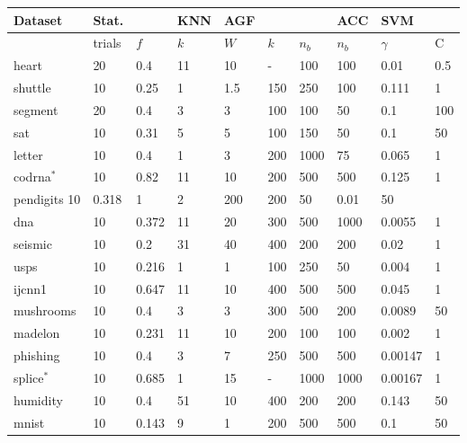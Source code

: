 
\begin{tabular}{l||ll|l|lll|l|ll|}
Dataset	& Stat. & & KNN & AGF & & & ACC & SVM & \\\hline
 & trials & $f$ & $k$ & $W$ & $k$ & $n_b$ & $n_b$ & $\gamma$ & C\\\hline\hline
	heart & 20 & 0.4 & 11 & 10 & - & 100 & 100 & 0.01 & 0.5 \\
	shuttle & 10 & 0.25 & 1 & 1.5 & 150 & 250 & 100 & 0.111 & 1 \\
	segment & 20 & 0.4 & 3 & 3 & 100 & 100 & 50 & 0.1 & 100 \\
	sat & 10 & 0.31 & 5 & 5 & 100 & 150 & 50 & 0.1 & 50\\
	letter & 10 & 0.4 & 1 & 3 & 200 & 1000 & 75 & 0.065 & 1 \\
	codrna$^*$ & 10 & 0.82 & 11 & 10 & 200 & 500 & 500 & 0.125 & 1 \\
	pendigits 10 & 0.318 & 1 & 2 & 200 & 200 & 50 & 0.01 & 50 \\
	dna & 10 & 0.372 & 11 & 20 & 300 & 500 & 1000 & 0.0055 & 1 \\
	seismic & 10 & 0.2 & 31 & 40 & 400 & 200 & 200 & 0.02 & 1 \\
	usps & 10 & 0.216 & 1 & 1 & 100 & 250 & 50 & 0.004 & 1 \\
	ijcnn1 & 10 & 0.647 & 11 & 10 & 400 & 500 & 500 & 0.045 & 1 \\
	mushrooms & 10 & 0.4 & 3 & 3 & 300 & 500 & 200 & 0.0089 & 50 \\
	madelon & 10 & 0.231 & 11 & 10 & 200 & 100 & 100 & 0.002 & 1 \\
	phishing & 10 & 0.4 & 3 & 7 & 250 & 500 & 500 & 0.00147 & 1 \\
	splice$^*$ & 10 & 0.685 & 1 & 15 & - & 1000 & 1000 & 0.00167 & 1 \\
	humidity & 10 & 0.4 & 51 & 10 & 400 & 200 & 200 & 0.143 & 50 \\
	mnist & 10 & 0.143 & 9 & 1 & 200 & 500 & 500 & 0.1 & 50 \\
	\hline
\end{tabular}

